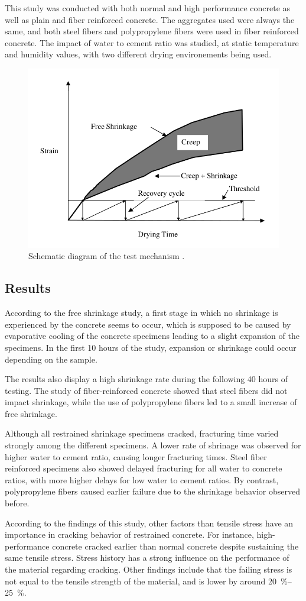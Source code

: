 \documentclass{report}
\begin{document}
This study was conducted with both normal and high performance concrete as
well as plain and fiber reinforced concrete. The aggregates used were always
the same, and both steel fibers and polypropylene fibers were used in fiber
reinforced concrete. The impact of water to cement ratio was studied, at
static temperature and humidity values, with two different drying environements
being used.

\begin{figure}
  \centering
  \includegraphics[width=.5\linewidth]{aci1}
  \caption{Schematic diagram of the test mechanism \cite{cscea}.}\label{aci1}
\end{figure}

\subsection{Results}
According to the free shrinkage study, a first stage in which no shrinkage is
experienced by the concrete seems to occur, which is supposed to be caused by
evaporative cooling of the concrete specimens leading to a slight expansion of
the specimens. In the first 10 hours of the study, expansion or shrinkage could
occur depending on the sample.

The results also display a high shrinkage rate during the following 40 hours of
testing. The study of fiber-reinforced concrete showed that steel fibers did
not impact shrinkage, while the use of polypropylene fibers led to a small
increase of free shrinkage.

Although all restrained shrinkage specimens cracked, fracturing time varied
strongly among the different specimens. A lower rate of shrinage was observed
for higher water to cement ratio, causing longer fracturing times. Steel
fiber reinforced specimens also showed delayed fracturing for all water to
concrete ratios, with more higher delays for low water to cement ratios. By
contrast, polypropylene fibers caused earlier failure due to the shrinkage
behavior observed before.

According to the findings of this study, other factors than tensile stress have
an importance in cracking behavior of restrained concrete. For instance,
high-performance concrete cracked earlier than normal concrete despite
sustaining the same tensile stress. Stress history has a strong influence on
the performance of the material regarding cracking. Other findings include that
the failing stress is not equal to the tensile strength of the material, and is
lower by around \SIrange{20}{25}{\percent}.
\end{document}
